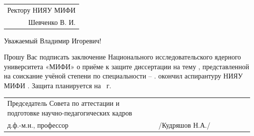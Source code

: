     \begin{table}[h!]
        \raggedleft
            \begin{tabular}{r}
                Ректору НИЯУ МИФИ \\[5pt]
                Шевченко В. И.
            \end{tabular}
    \end{table}

    \vspace{20mm}

    \hfil Уважаемый Владимир Игоревич! \hfil

    Прошу Вас подписать заключение Национального исследовательского ядерного университета «МИФИ» о приёме к защите диссертации   на тему , представленной на соискание учёной степени  по специальности  – .  окончил аспирантуру НИЯУ МИФИ . Защита планируется на ~г.

    \vspace{60mm}

    \begin{table}[h]
        \begin{tabular}{p{0.6\linewidth}p{0.4\linewidth}}
            Председатель Совета по аттестации и подготовке научно-педагогических кадров & \\
            д.ф.-м.н., профессор  & \uline{\hspace{6em}}~/Кудряшов Н.А./
            \\
        \end{tabular}
    \end{table}